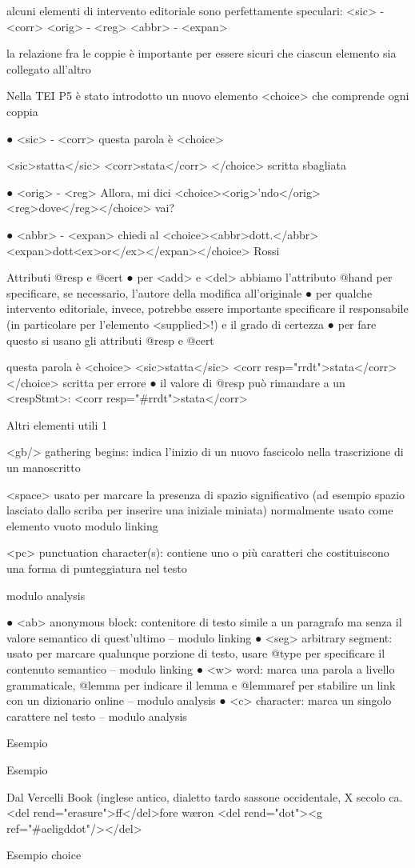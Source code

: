  alcuni elementi di intervento editoriale sono perfettamente speculari:
<sic> - <corr> <orig> - <reg> <abbr> - <expan>


la relazione fra le coppie è importante per essere sicuri che ciascun elemento sia collegato all’altro

Nella TEI P5 è stato introdotto un nuovo elemento <choice> che comprende ogni coppia

● <sic> - <corr>
questa parola è <choice>

<sic>statta</sic>
<corr>stata</corr> </choice> scritta sbagliata

● <orig> - <reg>
Allora, mi dici <choice><orig>’ndo</orig> <reg>dove</reg></choice> vai?

● <abbr> - <expan>
chiedi al <choice><abbr>dott.</abbr> <expan>dott<ex>or</ex></expan></choice> Rossi

Attributi @resp e @cert
● per <add> e <del> abbiamo l’attributo @hand per specificare, se necessario, l’autore della modifica all’originale
● per qualche intervento editoriale, invece, potrebbe essere importante specificare il responsabile (in particolare per l’elemento <supplied>!) e il grado di certezza
● per fare questo si usano gli attributi @resp e @cert

questa parola è <choice>
<sic>statta</sic>
<corr resp="rrdt">stata</corr> </choice> scritta per errore
● il valore di @resp può rimandare a un <respStmt>: <corr resp="#rrdt">stata</corr>


Altri elementi utili 1

<gb/> gathering begins: indica l’inizio di un nuovo fascicolo nella trascrizione di un manoscritto

<space> usato per marcare la presenza di spazio significativo (ad esempio spazio lasciato dallo scriba per inserire una iniziale miniata)
normalmente usato come elemento vuoto modulo linking

<pc> punctuation character(s): contiene uno o più caratteri che costituiscono una forma di punteggiatura nel testo

modulo analysis

● <ab> anonymous block: contenitore di testo simile a un paragrafo ma senza il valore semantico di quest’ultimo
– modulo linking
● <seg> arbitrary segment: usato per marcare qualunque porzione di testo,
usare @type per specificare il contenuto semantico – modulo linking
● <w> word: marca una parola a livello grammaticale, @lemma per indicare il lemma e @lemmaref per stabilire un link con un dizionario online
– modulo analysis
● <c> character: marca un singolo carattere nel testo
– modulo analysis

Esempio

Esempio

Dal Vercelli Book (inglese antico, dialetto tardo sassone occidentale, X secolo ca.
<del rend="erasure">ff</del>fore wæron
<del rend="dot"><g ref="#aeligddot"/></del>

Esempio choice


